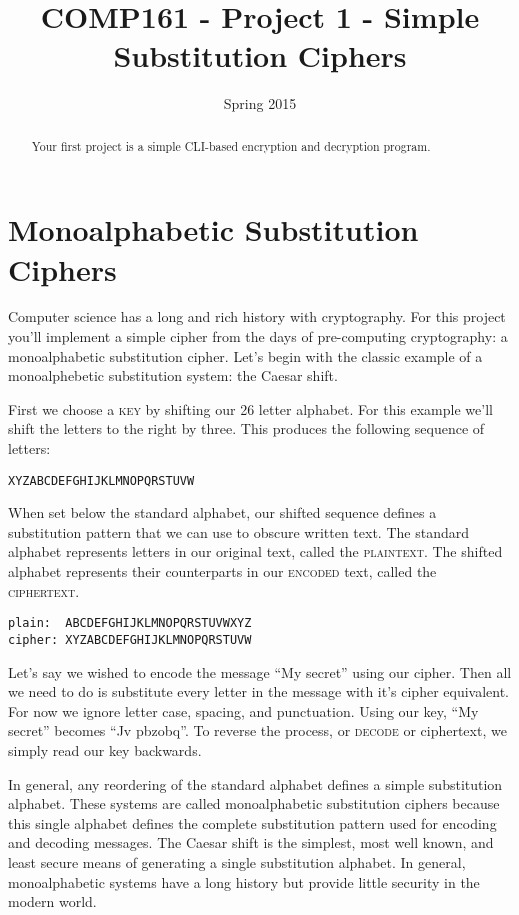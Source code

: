 \documentclass[]{tufte-handout}
\title{COMP161 - Project 1 - Simple Substitution Ciphers}
\author{}
\date{Spring 2015}
\begin{document}
\maketitle

\begin{abstract}
Your first project is a simple CLI-based encryption and decryption program.
\end{abstract}

\section{Monoalphabetic Substitution Ciphers}

Computer science has a long and rich history with cryptography.  For this project you'll implement a simple cipher from the days of pre-computing cryptography: a monoalphabetic substitution cipher.  Let's begin with the classic example of a monoalphebetic substitution system: the Caesar shift. 

First we choose a \textsc{key} by shifting our 26 letter alphabet.  For this example we'll shift the letters to the right by three. This produces the following sequence of letters:
\begin{verbatim}
XYZABCDEFGHIJKLMNOPQRSTUVW
\end{verbatim}
When set below the standard alphabet, our shifted sequence defines a substitution pattern that we can use to obscure written text.  The standard alphabet represents letters in our original text, called the \textsc{plaintext}. The shifted alphabet represents their counterparts in our \textsc{encoded} text, called the \textsc{ciphertext}. 
\begin{verbatim}
plain:  ABCDEFGHIJKLMNOPQRSTUVWXYZ
cipher: XYZABCDEFGHIJKLMNOPQRSTUVW
\end{verbatim}

Let's say we wished to encode the message ``My secret'' using our cipher.  Then all we need to do is substitute every letter in the message with it's cipher equivalent. For now we ignore letter case, spacing, and punctuation.  Using our key, ``My secret'' becomes ``Jv pbzobq''. To reverse the process, or \textsc{decode} or ciphertext, we simply read our key backwards. 

In general, any reordering of the standard alphabet defines a simple substitution alphabet. These systems are called monoalphabetic substitution ciphers because this single alphabet defines the complete substitution pattern used for encoding and decoding messages.  The Caesar shift is the simplest, most well known, and least secure means of generating a single substitution alphabet.  In general, monoalphabetic systems have a long history but provide little security in the modern world.  
\end{document}
